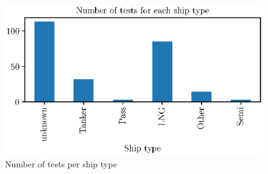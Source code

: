 \begin{figure}[H]
    \centering
    \includegraphics[width=0.5\columnwidth]{figures/ship_types.eps}
    \caption{Number of tests per ship type}
    \label{fig:ship_types}
\end{figure}

\begin{figure}[H]
    \centering
    \begin{subfigure}[b]{0.48\textwidth}
        \centering
  

\end{subfigure}
\end{figure}
